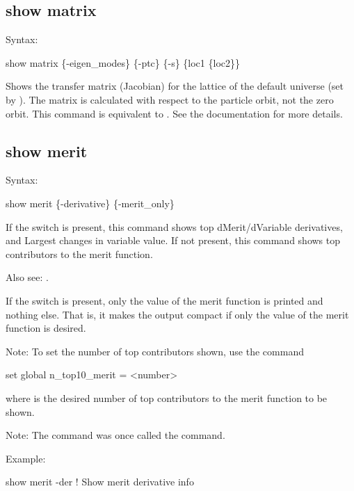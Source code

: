 {{{{{{{{%

\subsection{show matrix}
\label{s:show.matrix}

Syntax:
\begin{example}
  show matrix \{-eigen_modes\} \{-ptc\} \{-s\} \{loc1 \{loc2\}\}
\end{example}


Shows the transfer matrix (Jacobian) for the  lattice of the default universe (set by
). The matrix is calculated with respect to the particle orbit, not the
zero orbit. This command is equivalent to . See the  documentation for more details.


\subsection{show merit}
\label{s:show.merit}

Syntax:
\begin{example}
  show merit \{-derivative\} \{-merit_only\}
\end{example}

If the  switch is present, this command shows top dMerit/dVariable
derivatives, and Largest changes in variable value. If not present, this command shows
top contributors to the merit function.

Also see: .

If the  switch is present, only the value of the merit function is printed
and nothing else. That is, it makes the output compact if only the value of the merit function
is desired.

Note: To set the number of top contributors shown, use the command 
\begin{example}
  set global n_top10_merit = <number>
\end{example}
where  is the desired number of top contributors to the merit function to be shown.

Note: The  command was once called the  command.

Example:
\begin{example}
  show merit -der     ! Show merit derivative info
\end{example}

}}}}}}}}
